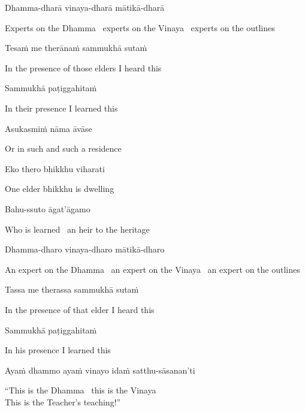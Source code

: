 Dhamma-dharā vinaya-dharā mātikā-dharā

\begin{english-hang}
  Experts on the Dhamma \breathmark\ experts on the Vinaya \breathmark\ experts on the outlines
\end{english-hang}

Tesaṁ me therānaṁ sammukhā sutaṁ

\begin{english}
  In the presence of those elders I heard this
\end{english}

Sammukhā paṭiggahitaṁ

\begin{english}
  In their presence I learned this
\end{english}

Asukasmiṁ nāma āvāse

\begin{english}
  Or in such and such a residence
\end{english}

Eko thero bhikkhu viharati

\begin{english}
  One elder bhikkhu is dwelling
\end{english}

Bahu-ssuto āgat'āgamo

\begin{english}
  Who is learned \breathmark\ an heir to the heritage
\end{english}

Dhamma-dharo vinaya-dharo mātikā-dharo

\begin{english-hang}
  An expert on the Dhamma \breathmark\ an expert on the Vinaya \breathmark\ an expert on the outlines
\end{english-hang}

Tassa me therassa sammukhā sutaṁ

\begin{english}
  In the presence of that elder I heard this
\end{english}

Sammukhā paṭiggahitaṁ

\begin{english}
  In his presence I learned this
\end{english}

Ayaṁ dhammo ayaṁ vinayo idaṁ satthu-sāsanan'ti

\begin{english}
  ``This is the Dhamma \breathmark\ this is the Vinaya\\
  This is the Teacher's teaching!''
\end{english}

